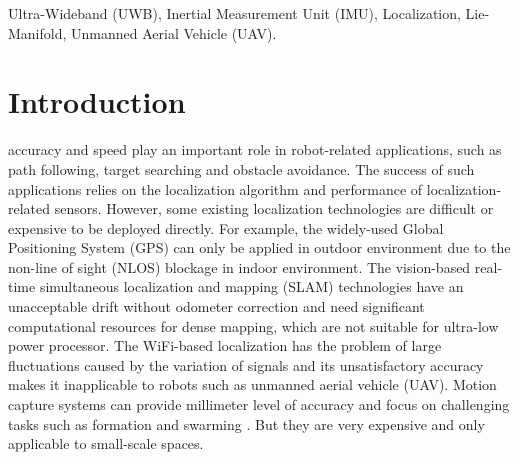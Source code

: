 \documentclass[journal]{IEEEtran}
\begin{document}
\begin{IEEEkeywords}
Ultra-Wideband (UWB), Inertial Measurement Unit (IMU), Localization, Lie-Manifold,  Unmanned Aerial Vehicle (UAV).
\end{IEEEkeywords}


%
\IEEEpeerreviewmaketitle



\section{Introduction}
% 
% 
% 
% 
 accuracy and speed play an important role in robot-related applications, such as path following, target searching and obstacle avoidance. The success of such applications relies on the localization algorithm and performance of localization-related sensors. However, some existing localization technologies are difficult or expensive to be deployed directly. For example, the widely-used Global Positioning System (GPS) can only be applied in outdoor environment due to the non-line of sight (NLOS) blockage in indoor environment. The vision-based real-time simultaneous localization and mapping (SLAM)  technologies  \cite{Engel:2014fd, JakobEngel:2014uc, AnkurHanda:2014ub} have an unacceptable drift without odometer correction and need significant computational resources for dense mapping, which are not suitable for ultra-low power processor. The WiFi-based localization \cite{Chen:2015bk,Sen:2013tv,Deng:2015js} has the problem of large  fluctuations caused by the variation of signals and its unsatisfactory accuracy makes it inapplicable to robots such as unmanned aerial vehicle (UAV). Motion capture systems can provide millimeter level of accuracy and focus on challenging tasks such as formation and swarming \cite{Lupashin:2014bf,Kushleyev:2013wy}. But they are very expensive and only applicable to small-scale spaces. 
\end{document}
